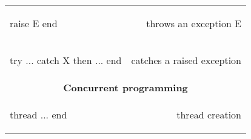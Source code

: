 \documentclass[12pt]{article}
\begin{document}
\begin{longtable}{l r}
\begin{oz}
raise E end
\end{oz}
&throws an exception E \\

\begin{oz}
try ... catch X then ... end
\end{oz}
&catches a raised exception\\[0.4em]


\multicolumn{2}{c}{\textbf{Concurrent programming}}\\

\begin{oz}
thread ... end
\end{oz}
&thread creation\\

\bottomrule
\end{longtable}
\end{document}
